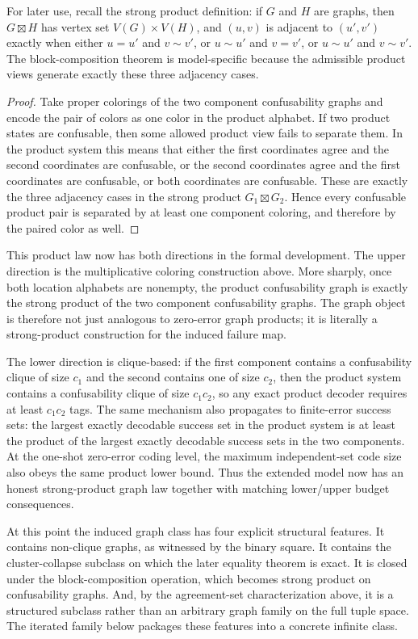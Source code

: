 For later use, recall the strong product definition: if $G$ and $H$ are graphs, then $G\boxtimes H$ has vertex set $V(G)\times V(H)$, and $(u,v)$ is adjacent to $(u',v')$ exactly when either $u=u'$ and $v\sim v'$, or $u\sim u'$ and $v=v'$, or $u\sim u'$ and $v\sim v'$. The block-composition theorem is model-specific because the admissible product views generate exactly these three adjacency cases.

\begin{proof}
Take proper colorings of the two component confusability graphs and encode the pair of colors as one color in the product alphabet. If two product states are confusable, then some allowed product view fails to separate them. In the product system this means that either the first coordinates agree and the second coordinates are confusable, or the second coordinates agree and the first coordinates are confusable, or both coordinates are confusable. These are exactly the three adjacency cases in the strong product $G_1\boxtimes G_2$. Hence every confusable product pair is separated by at least one component coloring, and therefore by the paired color as well.
\end{proof}

This product law now has both directions in the formal development. The upper direction is the multiplicative coloring construction above. More sharply, once both location alphabets are nonempty, the product confusability graph is exactly the strong product of the two component confusability graphs. The graph object is therefore not just analogous to zero-error graph products; it is literally a strong-product construction for the induced failure map. 

The lower direction is clique-based: if the first component contains a confusability clique of size $c_1$ and the second contains one of size $c_2$, then the product system contains a confusability clique of size $c_1c_2$, so any exact product decoder requires at least $c_1c_2$ tags. The same mechanism also propagates to finite-error success sets: the largest exactly decodable success set in the product system is at least the product of the largest exactly decodable success sets in the two components. At the one-shot zero-error coding level, the maximum independent-set code size also obeys the same product lower bound. Thus the extended model now has an honest strong-product graph law together with matching lower/upper budget consequences.

At this point the induced graph class has four explicit structural features. It contains non-clique graphs, as witnessed by the binary square. It contains the cluster-collapse subclass on which the later equality theorem is exact. It is closed under the block-composition operation, which becomes strong product on confusability graphs. And, by the agreement-set characterization above, it is a structured subclass rather than an arbitrary graph family on the full tuple space. The iterated family below packages these features into a concrete infinite class.

